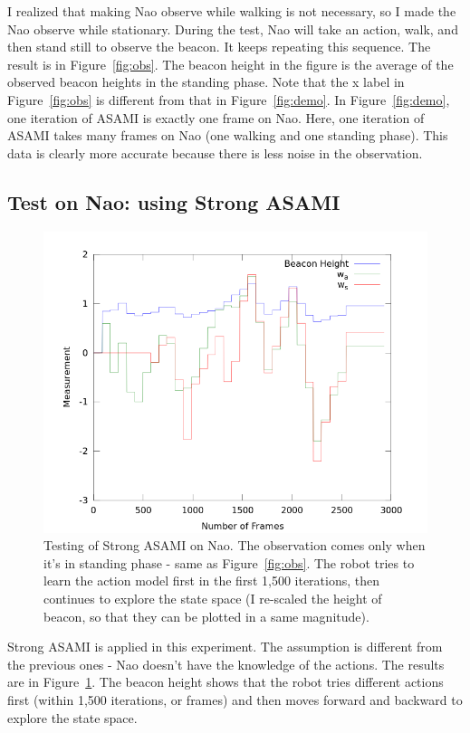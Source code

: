 \documentclass[12pt]{article}
\begin{document}
I realized that making Nao observe while walking is not necessary, so
I made the Nao observe while stationary.
During the test, Nao will take an action, walk, and then stand still
to observe the beacon.
 It keeps repeating
this sequence. The result is in Figure~\ref{fig:obs}.  The 
beacon height in the figure is the average of the observed beacon heights in
the standing phase. Note that the x label in Figure~\ref{fig:obs} is
different from that in Figure~\ref{fig:demo}. In Figure~\ref{fig:demo},
one iteration of ASAMI is exactly one frame on Nao. Here, one
iteration of ASAMI takes many frames on Nao (one walking and one
standing phase). This data is clearly more accurate because there is
less noise in the observation.

\subsection{Test on Nao: using Strong ASAMI}

\begin{figure}[h]
\centering
\includegraphics[width=0.7\columnwidth]{out_strong.png}
\caption{Testing of Strong ASAMI on Nao. The observation comes only
when it's in standing phase - same as Figure~\ref{fig:obs}. The robot
tries to learn the action model first in the first 1,500 iterations,
then continues to explore the state space (I re-scaled the height of
beacon, so that they can be plotted in a same magnitude).}
\label{fig:obs_strong}
\end{figure}

Strong ASAMI is applied in this experiment. The assumption is
different from the previous ones - Nao doesn't have the knowledge of
the actions. The results are in Figure~\ref{fig:obs_strong}. The
beacon height shows that the robot tries different actions
first (within 1,500 iterations, or frames) and then moves forward and
backward to explore the state space.
\end{document}
